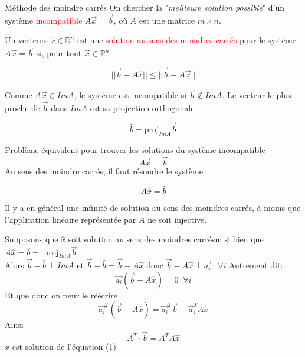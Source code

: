 \begin{parag}{Méthode des moindre carrés}
    On chercher la "\textit{meilleure solution possible}" d'un système \textcolor{red}{incompatible} $A\vec{x} = \vec{b}$, où $A$ est une matrice $m \times n$.
    \begin{definition}
        Un vecteurs $\hat{x} \in \mathbb{R}^n$ est une \textcolor{red}{solution au sens des moindres carrés} pour le système $A\vec{x} = \vec{b}$ si, pour tout $\vec{x} \in \mathbb{R}^n$
        \begin{formule}
            \[||\vec{b}-A\hat{x}|| \leq ||\vec{b} - A\vec{x}||\]
        \end{formule}
        
    \end{definition}
    Comme $A\vec{x} \in ImA$, le système est incompatible si $\vec{b} \notin ImA$. Le vecteur le plus proche de $\vec{b}$ dans $ImA$ est sa projection orthogonale
    \begin{formule}
        \[\hat{b} = \text{proj}_{ImA}\vec{b}\]
    \end{formule}
    \begin{subparag}{Problème équivalent}
        pour trouver les solutions  du système incompatible
        \[A\vec{x} = \vec{b}\]
        Au sens des moindre carrés, il faut résoudre le système
        \begin{formule}
            \[A\hat{x} = \hat{b}\]
        \end{formule}
        \begin{framedremark}
            Il y a en général une infinité de solution au sens des moindres carrés, à moins que l'application linéaire représentée par $A$ ne soit injective.
        \end{framedremark}
        Supposons que $\hat{x}$ soit solution au sens des moindres carrésm si bien que $A\hat{x} = \hat{b} = $ proj$_{ImA}\vec{b}$
        \\
        Alors $\vec{b} - \hat{b} \perp ImA$ et $\vec{b} - \hat{b} = \vec{b} - A\hat{x}$ donc $\vec{b} - A\hat{x} \perp \vec{a_i} \; \; \; \forall i$ Autrement dit:
        \[\vec{a_i}(\vec{b} - A\hat{x}) = 0 \; \; \forall i\]
        Et que donc on peur le réécrire
        \[\vec{a_i}^T(\vec{b} - A\hat{x}) = \vec{a_i}^T\vec{b} - \vec{a}_i^TA\hat{x}\]
        Ainsi
        \begin{equation}
            A^T\cdot\vec{b} = A^TA\hat{x}
        \end{equation}
        $\hat{x}$ est solution de l'équation  (1) 
        
    \end{subparag}
\end{parag}

